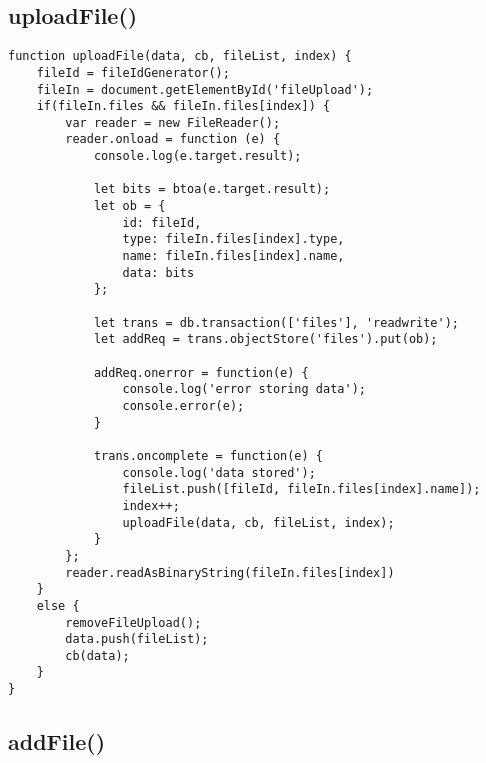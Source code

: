 \documentclass[letterpaper]{article}
\begin{document}
\subsection{uploadFile()}

\begin{lstlisting}[firstnumber=38]
function uploadFile(data, cb, fileList, index) {
    fileId = fileIdGenerator();
    fileIn = document.getElementById('fileUpload');
    if(fileIn.files && fileIn.files[index]) {
        var reader = new FileReader();
        reader.onload = function (e) {
            console.log(e.target.result);

            let bits = btoa(e.target.result);
            let ob = {
                id: fileId,
                type: fileIn.files[index].type,
                name: fileIn.files[index].name,
                data: bits
            };

            let trans = db.transaction(['files'], 'readwrite');
            let addReq = trans.objectStore('files').put(ob);

            addReq.onerror = function(e) {
                console.log('error storing data');
                console.error(e);
            }

            trans.oncomplete = function(e) {
                console.log('data stored');
                fileList.push([fileId, fileIn.files[index].name]);
                index++;
                uploadFile(data, cb, fileList, index);
            }
        };
        reader.readAsBinaryString(fileIn.files[index])
    }
    else {
        removeFileUpload();
        data.push(fileList);
        cb(data);
    }
}
\end{lstlisting}

\subsection{addFile()}
\end{document}

